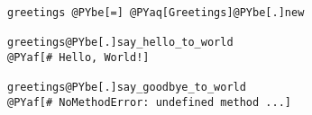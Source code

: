\begin{Verbatim}[commandchars=@\[\]]
greetings @PYbe[=] @PYaq[Greetings]@PYbe[.]new

greetings@PYbe[.]say_hello_to_world
@PYaf[# Hello, World!]

greetings@PYbe[.]say_goodbye_to_world
@PYaf[# NoMethodError: undefined method ...]
\end{Verbatim}
